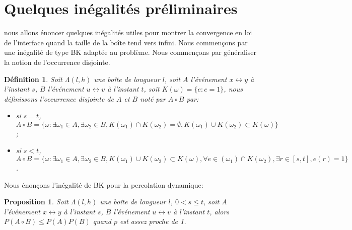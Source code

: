 \documentclass[titlepage,a4paper,12pt]{article}
\newcounter{def}
\newcounter{prop}
\newtheorem{occ}[def]{Définition}
\newtheorem{bk}[prop]{Proposition}
\begin{document}
\section{Quelques inégalités préliminaires}
nous allons énoncer quelques inégalités utiles pour montrer la convergence en loi de l'interface quand la taille de la boîte tend vers infini. Nous commençons par une inégalité de type BK adaptée au problème. Nous commençons par généraliser la notion de l'occurrence disjointe.

\begin{occ}
Soit $\Lambda(l,h)$ une boîte de longueur $l$, soit $A$ l'événement $x\longleftrightarrow y$ à l'instant $s$, $B$ l'événement $u\longleftrightarrow v$ à l'instant $t$, soit $K(\omega) = \{e: e=1\}$, nous définissons l'occurrence disjointe de $A$ et $B$ noté par $A\circ B$ par:
\begin{itemize}
\item si $s=t$, $A\circ B = \{\omega: \exists\omega_1\in A,\exists\omega_2\in B, K(\omega_1)\cap K(\omega_2) = \emptyset, K(\omega_1)\cup K(\omega_2)\subset K(\omega) \}$;
\item si $s<t$, $A\circ B = \{\omega: \exists\omega_1\in A,\exists\omega_2\in B, K(\omega_1)\cup K(\omega_2)\subset K(\omega), \forall e\in (\omega_1)\cap K(\omega_2), \exists r\in [s,t], e(r) = 1 \}$.
\end{itemize}
\end{occ}
Nous énonçons l'inégalité de BK pour la percolation dynamique:

\begin{bk}
Soit $\Lambda(l,h)$ une boîte de longueur $l$, $0<s\leqslant t$, soit $A$ l'événement $x\longleftrightarrow y$ à l'instant $s$, $B$ l'événement $u\longleftrightarrow v$ à l'instant $t$, alors $P(A\circ B) \leqslant P(A)P(B)$ quand $p$ est assez proche de 1.
\end{bk}
\end{document}
